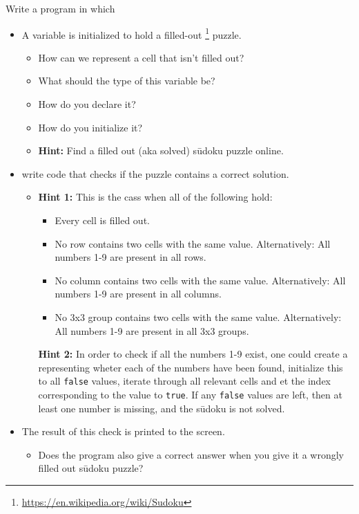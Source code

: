 Write a program in which
\begin{itemize}
  \item A variable is initialized to hold a filled-out \footnote{\url{https://en.wikipedia.org/wiki/Sudoku}} puzzle.
    \begin{itemize}
      \item How can we represent a cell that isn't filled out?
      \item What should the type of this variable be?
      \item How do you declare it?
      \item How do you initialize it?
      \item \textbf{Hint:} Find a filled out (aka solved) sūdoku puzzle online.
    \end{itemize}
  \item write code that checks if the puzzle contains a correct solution.
    \begin{itemize}
      \item \textbf{Hint 1:} This is the cass when all of the following hold:
        \begin{itemize}
          \item Every cell is filled out.
          \item No row contains two cells with the same value. Alternatively: All numbers 1-9 are present in all rows.
          \item No column contains two cells with the same value. Alternatively: All numbers 1-9 are present in all columns.
          \item No 3x3 group contains two cells with the same value. Alternatively: All numbers 1-9 are present in all 3x3 groups.
        \end{itemize}
      \textbf{Hint 2:} In order to check if all the numbers 1-9 exist, one could create a  representing wheter each of the numbers have been found, initialize this to all \texttt{false} values, iterate through all relevant cells and et the index corresponding to the value to \texttt{true}. If any \texttt{false} values are left, then at least one number is missing, and the sūdoku is not solved.
    \end{itemize}
  \item The result of this check is printed to the screen.
    \begin{itemize}
      \item Does the program also give a correct answer when you give it a wrongly filled out sūdoku puzzle?
    \end{itemize}
\end{itemize}

